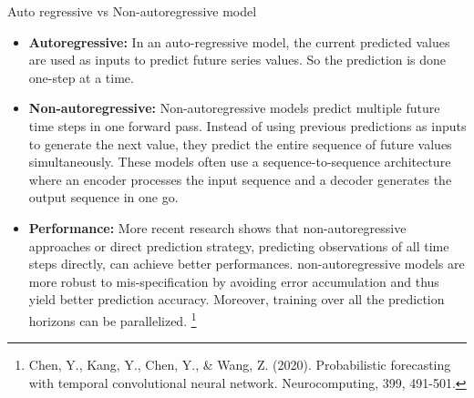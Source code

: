 \documentclass[8pt,xcolor=dvipsnames,compress]{beamer}
\begin{document}
\begin{frame}{Auto regressive vs Non-autoregressive model}


\begin{itemize}

    \item \textbf{Autoregressive:} In an auto-regressive model, the current predicted values are used as inputs to predict future series values. So the prediction is done one-step at a time. 

    \item \textbf{Non-autoregressive:} Non-autoregressive models predict multiple future time steps in one forward pass. Instead of using previous predictions as inputs to generate the next value, they predict the entire sequence of future values simultaneously. These models often use a sequence-to-sequence architecture where an encoder processes the input sequence and a decoder generates the output sequence in one go.

    \item \textbf{Performance:} More recent research shows that non-autoregressive approaches or direct prediction strategy, predicting observations of all time steps directly, can achieve better performances. non-autoregressive models are more robust to mis-specification by avoiding error accumulation and thus yield better prediction accuracy. Moreover, training over all the prediction horizons can be parallelized. \footnote{Chen, Y., Kang, Y., Chen, Y., & Wang, Z. (2020). Probabilistic forecasting with temporal convolutional neural network. Neurocomputing, 399, 491-501.}
\end{itemize}

\end{frame}
\end{document}
